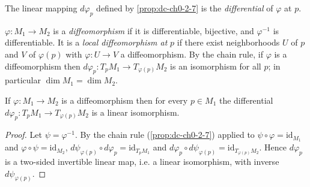 \begin{definition}[differential]
  \label{def:dc-ch0-2-8}
  \leanok
  The linear mapping $d\varphi_p$ defined by \cref{prop:dc-ch0-2-7} is the \emph{differential}
  of $\varphi$ at $p$.
\end{definition}

\begin{definition}
  \label{def:dc-ch0-2-9}
  \leanok
  $\varphi:M_1\to M_2$ is a \emph{diffeomorphism} if it is differentiable, bijective, and
  $\varphi^{-1}$ is differentiable. It is a \emph{local diffeomorphism at} $p$ if there
  exist neighborhoods $U$ of $p$ and $V$ of $\varphi(p)$ with $\varphi:U\to V$ a
  diffeomorphism. By the chain rule, if $\varphi$ is a diffeomorphism then
  $d\varphi_p:T_pM_1\to T_{\varphi(p)}M_2$ is an isomorphism for all $p$; in
  particular $\dim M_1=\dim M_2$.
\end{definition}

\begin{lemma}
  \label{lem:dc-ch0-2-9-iso}
  \leanok
  If $\varphi:M_1\to M_2$ is a diffeomorphism then for every $p\in M_1$ the
  differential $d\varphi_p:T_pM_1\to T_{\varphi(p)}M_2$ is a linear isomorphism.
\end{lemma}
\begin{proof}
  \leanok
  Let $\psi=\varphi^{-1}$. By the chain rule (\cref{prop:dc-ch0-2-7}) applied to
  $\psi\circ\varphi=\mathrm{id}_{M_1}$ and $\varphi\circ\psi=\mathrm{id}_{M_2}$,
  $d\psi_{\varphi(p)}\circ d\varphi_p=\mathrm{id}_{T_pM_1}$ and
  $d\varphi_p\circ d\psi_{\varphi(p)}=\mathrm{id}_{T_{\varphi(p)}M_2}$. Hence
  $d\varphi_p$ is a two-sided invertible linear map, i.e. a linear isomorphism, with
  inverse $d\psi_{\varphi(p)}$.
\end{proof}

